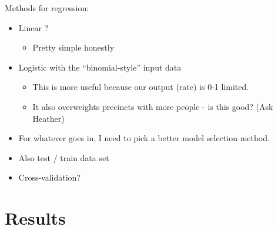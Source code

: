 \documentclass[12pt,twoside]{reedthesis}
\providecommand{\tightlist}{%
  \setlength{\itemsep}{0pt}\setlength{\parskip}{0pt}}
\theoremstyle{definition}
\theoremstyle{definition}
\theoremstyle{definition}
\theoremstyle{remark}
\begin{document}
Methods for regression:
\begin{itemize}
\tightlist
\item
  Linear ?
  \begin{itemize}
  \tightlist
  \item
    Pretty simple honestly
  \end{itemize}
\item
  Logistic with the ``binomial-style'' input data
  \begin{itemize}
  \tightlist
  \item
    This is more useful because our output (rate) is 0-1 limited.
  \item
    It also overweights precincts with more people - is this good? (Ask
    Heather)
  \end{itemize}
\item
  For whatever goes in, I need to pick a better model selection method.
\item
  Also test / train data set
\item
  Cross-validation?
\end{itemize}
\hypertarget{results}{%
\chapter{Results}\label{results}}
\end{document}
